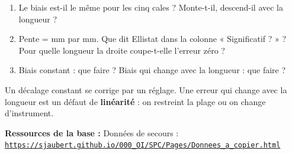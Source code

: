 \documentclass[10pt,a4paper]{article}
\begin{document}
\begin{enumerate}[label=\textcolor{cyan}{\textbf{Q\arabic*.}},leftmargin=22pt]
\item Le biais est-il le même pour les cinq cales ? Monte-t-il, descend-il avec la longueur ?\reponse[2]
\item Pente = \champ{18mm} mm par mm. Que dit Ellistat dans la colonne « Significatif ? » ? Pour quelle longueur la droite coupe-t-elle l'erreur zéro ?\reponse[1]
\item Biais constant : que faire ? Biais qui change avec la longueur : que faire ?\reponse[2]
\end{enumerate}
\begin{tcolorbox}[retenir]Un décalage constant se corrige par un réglage. Une erreur qui change avec la longueur est un défaut de \textbf{linéarité} : on restreint la plage ou on change d'instrument.\end{tcolorbox}
\vfill{\footnotesize\color{uimm}\textbf{Ressources de la base :} Données de secours : \href{https://sjaubert.github.io/000_OI/SPC/Pages/Donnees_a_copier.html\#lin}{\nolinkurl{https://sjaubert.github.io/000_OI/SPC/Pages/Donnees_a_copier.html}}}
\end{document}
